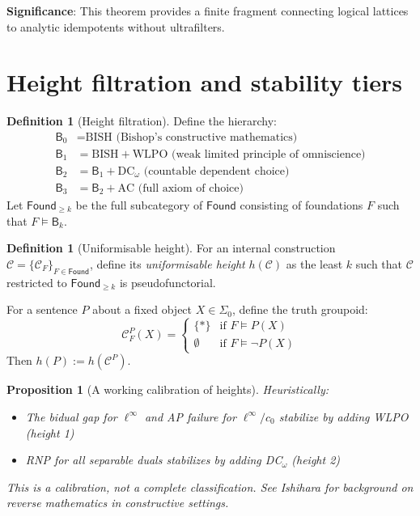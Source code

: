 \documentclass[11pt]{article}
\newtheorem{proposition}[theorem]{Proposition}
\theoremstyle{definition}
\newtheorem{definition}[theorem]{Definition}
\theoremstyle{remark}
\newcommand{\cnull}{c_0}
\newcommand{\linf}{\ell^\infty}
\newcommand{\Found}{\mathsf{Found}}
\begin{document}
\begin{mdframed}[style=okbox]
\textbf{Significance}: This theorem provides a finite fragment connecting logical lattices to analytic idempotents without ultrafilters.
\end{mdframed}

\section{Height filtration and stability tiers}\label{sec:height}

\begin{definition}[Height filtration]
Define the hierarchy:
\begin{align}
\mathsf{B}_0 &= \text{BISH} \text{ (Bishop's constructive mathematics)}\\
\mathsf{B}_1 &= \text{BISH} + \text{WLPO} \text{ (weak limited principle of omniscience)}\\
\mathsf{B}_2 &= \mathsf{B}_1 + \text{DC}_\omega \text{ (countable dependent choice)}\\
\mathsf{B}_3 &= \mathsf{B}_2 + \text{AC} \text{ (full axiom of choice)}
\end{align}
Let \(\Found_{\geq k}\) be the full subcategory of \(\Found\) consisting of foundations \(F\) such that \(F \models \mathsf{B}_k\).
\end{definition}

\begin{definition}[Uniformisable height]\label{def:height}
For an internal construction \(\mathcal{C} = \{\mathcal{C}_F\}_{F \in \Found}\), define its \emph{uniformisable height} \(h(\mathcal{C})\) as the least \(k\) such that \(\mathcal{C}\) restricted to \(\Found_{\geq k}\) is pseudofunctorial. 

For a sentence \(P\) about a fixed object \(X \in \Sigma_0\), define the truth groupoid:
\[\mathcal{C}_F^P(X) = \begin{cases} 
\{\ast\} & \text{if } F \models P(X) \\
\emptyset & \text{if } F \models \neg P(X)
\end{cases}\]
Then \(h(P) := h(\mathcal{C}^P)\).
\end{definition}

\begin{proposition}[A working calibration of heights]\label{prop:height-table}
Heuristically:
\begin{itemize}
\item The bidual gap for \(\linf\) and AP failure for \(\linf/\cnull\) stabilize by adding WLPO (height 1)
\item RNP for all separable duals stabilizes by adding DC\(_\omega\) (height 2)
\end{itemize}
This is a calibration, not a complete classification. See Ishihara \cite{Ishihara06} for background on reverse mathematics in constructive settings.
\end{proposition}
\end{document}
